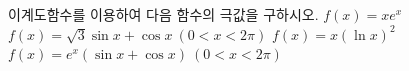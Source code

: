 이계도함수를 이용하여 다음 함수의 극값을 구하시오.
 $f(x)=xe^x$
 $f(x)=\sqrt{3}\sin x+\cos x\ (0<x<2\pi)$
 $f(x)=x(\ln x)^2$
 $f(x)=e^x(\sin x+\cos x)\ (0<x<2\pi)$
